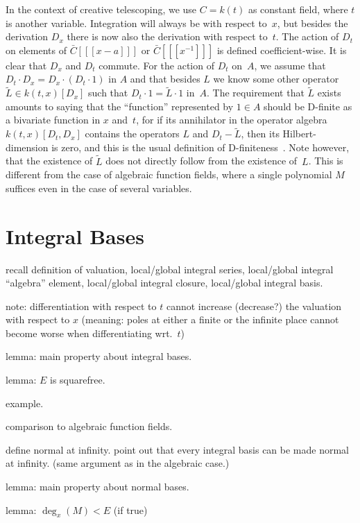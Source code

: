 \documentclass{sig-alternate}
\begin{document}
In the context of creative telescoping, we use $C=k(t)$ as constant field, where
$t$ is another variable. Integration will always be with respect to~$x$, but
besides the derivation $D_x$ there is now also the derivation with respect
to~$t$. The action of $D_t$ on elements of $\bar C[[[x-a]]]$ or $\bar
C[[[x^{-1}]]]$ is defined coefficient-wise. It is clear that $D_x$ and $D_t$
commute. For the action of $D_t$ on~$A$, we assume that $D_t\cdot D_x = D_x\cdot
(D_t\cdot 1)$ in $A$ and that besides $L$ we know some other operator $\tilde
L\in k(t,x)[D_x]$ such that $D_t\cdot 1=\tilde L\cdot 1$ in~$A$. The requirement
that $\tilde L$ exists amounts to saying that the ``function'' represented by
$1\in A$ should be D-finite as a bivariate function in $x$ and~$t$, for if its
annihilator in the operator algebra $k(t,x)[D_t,D_x]$ contains the operators $L$
and $D_t-\tilde L$, then its Hilbert-dimension is zero, and this is the usual
definition of D-finiteness~\cite{..,..}.  Note however, that the existence of
$\tilde L$ does not directly follow from the existence of~$L$. This is different
from the case of algebraic function fields, where a single polynomial $M$
suffices even in the case of several variables.

\section{Integral Bases}



recall definition of valuation, local/global integral series, local/global integral ``algebra'' element,
local/global integral closure, local/global integral basis.

note: differentiation with respect to $t$ cannot increase (decrease?) the valuation with respect to $x$
(meaning: poles at either a finite or the infinite place cannot become worse when differentiating wrt.~$t$)

lemma: main property about integral bases.

lemma: $E$ is squarefree. 

example. 

comparison to algebraic function fields. 

define normal at infinity. point out that every integral basis can be made normal at infinity.
(same argument as in the algebraic case.)

lemma: main property about normal bases. 

lemma: $\deg_x(M)< E$ (if true)
\end{document}
